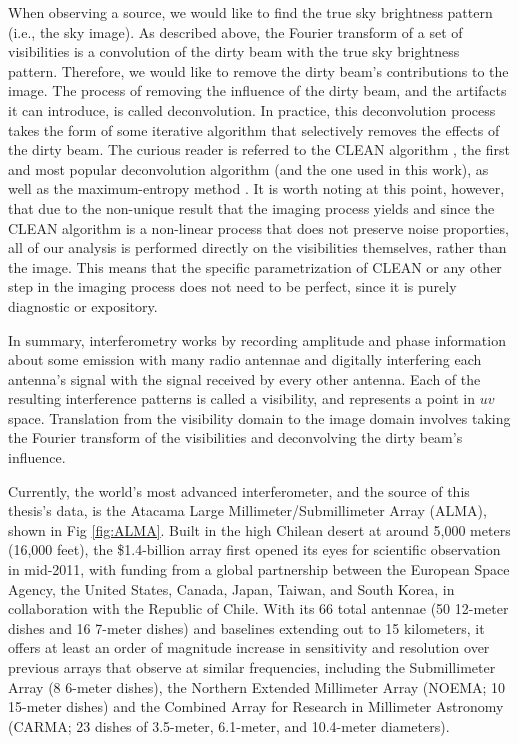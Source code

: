 When observing a source, we would like to find the true sky brightness pattern (i.e., the sky image). As described above, the Fourier transform of a set of visibilities is a convolution of the dirty beam with the true sky brightness pattern. Therefore, we would like to remove the dirty beam's contributions to the image. The process of removing the influence of the dirty beam, and the artifacts it can introduce, is called deconvolution. In practice, this deconvolution process takes the form of some iterative algorithm that selectively removes the effects of the dirty beam. The curious reader is referred to the CLEAN algorithm \citep{Hogbom1974}, the first and most popular deconvolution algorithm (and the one used in this work), as well as the maximum-entropy method \citep{Wernecke1977,SkillingBryan1984}. It is worth noting at this point, however, that due to the non-unique result that the imaging process yields and since the CLEAN algorithm is a non-linear process that does not preserve noise proporties, all of our analysis is performed directly on the visibilities themselves, rather than the image. This means that the specific parametrization of CLEAN or any other step in the imaging process does not need to be perfect, since it is purely diagnostic or expository.


In summary, interferometry works by recording amplitude and phase information about some emission with many radio antennae and digitally interfering each antenna's signal with the signal received by every other antenna. Each of the resulting interference patterns is called a visibility, and represents a point in $uv$ space. Translation from the visibility domain to the image domain involves taking the Fourier transform of the visibilities and deconvolving the dirty beam's influence.

Currently, the world's most advanced interferometer, and the source of this thesis's data, is the Atacama Large Millimeter/Submillimeter Array (ALMA), shown in Fig \ref{fig:ALMA}. Built in the high Chilean desert at around 5,000 meters (16,000 feet), the \$1.4-billion array first opened its eyes for scientific observation in mid-2011, with funding from a global partnership between the European Space Agency, the United States, Canada, Japan, Taiwan, and South Korea, in collaboration with the Republic of Chile. With its 66 total antennae (50 12-meter dishes and 16 7-meter dishes) and baselines extending out to 15 kilometers, it offers at least an order of magnitude increase in sensitivity and resolution over previous arrays that observe at similar frequencies, including the Submillimeter Array (8 6-meter dishes), the Northern Extended Millimeter Array (NOEMA; 10 15-meter dishes) and the Combined Array for Research in Millimeter Astronomy (CARMA; 23 dishes of 3.5-meter, 6.1-meter, and 10.4-meter diameters).

